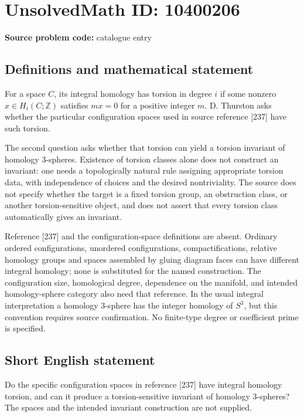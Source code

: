 \documentclass[11pt]{article}
\newcommand{\Z}{\mathbb{Z}}
\begin{document}
\section*{UnsolvedMath ID: 10400206}
\textbf{Source problem code:} catalogue entry
\subsection{Definitions and mathematical statement}
For a space \(C\), its integral homology has torsion in degree \(i\) if some nonzero \(x\in H_i(C;\Z)\) satisfies \(mx=0\) for a positive integer \(m\). D. Thurston asks whether the particular configuration spaces used in source reference [237] have such torsion.

The second question asks whether that torsion can yield a torsion invariant of homology 3-spheres. Existence of torsion classes alone does not construct an invariant: one needs a topologically natural rule assigning appropriate torsion data, with independence of choices and the desired nontriviality. The source does not specify whether the target is a fixed torsion group, an obstruction class, or another torsion-sensitive object, and does not assert that every torsion class automatically gives an invariant.

Reference [237] and the configuration-space definitions are absent. Ordinary ordered configurations, unordered configurations, compactifications, relative homology groups and spaces assembled by gluing diagram faces can have different integral homology; none is substituted for the named construction. The configuration size, homological degree, dependence on the manifold, and intended homology-sphere category also need that reference. In the usual integral interpretation a homology 3-sphere has the integer homology of \(S^3\), but this convention requires source confirmation. No finite-type degree or coefficient prime is specified.
\subsection{Short English statement}
Do the specific configuration spaces in reference [237] have integral homology torsion, and can it produce a torsion-sensitive invariant of homology 3-spheres? The spaces and the intended invariant construction are not supplied.
\end{document}
